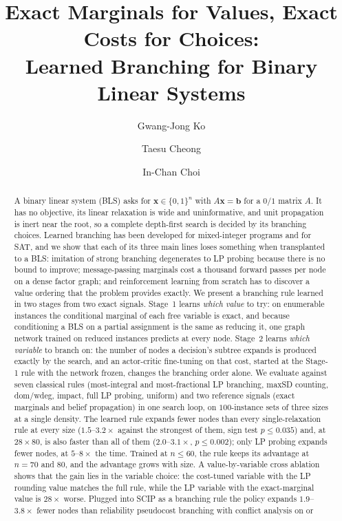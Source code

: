 \documentclass[final,5p,times,twocolumn,authoryear]{elsarticle}
\begin{document}
\begin{frontmatter}

\title{Exact Marginals for Values, Exact Costs for Choices:\\
Learned Branching for Binary Linear Systems}

\author[ku]{Gwang-Jong Ko}
\author[ku]{Taesu Cheong}
\author[ku]{In-Chan Choi}

\begin{abstract}
A binary linear system (BLS) asks for $\mathbf{x}\in\{0,1\}^n$ with $A\mathbf{x}=\mathbf{b}$ for a $0/1$ matrix $A$. It has no objective, its linear relaxation is wide and uninformative, and unit propagation is inert near the root, so a complete depth-first search is decided by its branching choices. Learned branching has been developed for mixed-integer programs and for SAT, and we show that each of its three main lines loses something when transplanted to a BLS: imitation of strong branching degenerates to LP probing because there is no bound to improve; message-passing marginals cost a thousand forward passes per node on a dense factor graph; and reinforcement learning from scratch has to discover a value ordering that the problem provides exactly. We present a branching rule learned in two stages from two exact signals. Stage~1 learns \emph{which value} to try: on enumerable instances the conditional marginal of each free variable is exact, and because conditioning a BLS on a partial assignment is the same as reducing it, one graph network trained on reduced instances predicts at every node. Stage~2 learns \emph{which variable} to branch on: the number of nodes a decision's subtree expands is produced exactly by the search, and an actor-critic fine-tuning on that cost, started at the Stage-1 rule with the network frozen, changes the branching order alone. We evaluate against seven classical rules (most-integral and most-fractional LP branching, maxSD counting, dom/wdeg, impact, full LP probing, uniform) and two reference signals (exact marginals and belief propagation) in one search loop, on $100$-instance sets of three sizes at a single density. The learned rule expands fewer nodes than every single-relaxation rule at every size ($1.5$--$3.2\times$ against the strongest of them, sign test $p\le0.035$) and, at $28\times80$, is also faster than all of them ($2.0$--$3.1\times$, $p\le0.002$); only LP probing expands fewer nodes, at $5$--$8\times$ the time. Trained at $n\le60$, the rule keeps its advantage at $n=70$ and $80$, and the advantage grows with size. A value-by-variable cross ablation shows that the gain lies in the variable choice: the cost-tuned variable with the LP rounding value matches the full rule, while the LP variable with the exact-marginal value is $28\times$ worse. Plugged into SCIP as a branching rule the policy expands $1.9$--$3.8\times$ fewer nodes than reliability pseudocost branching with conflict analysis on or 
\end{abstract}
\end{frontmatter}
\end{document}
